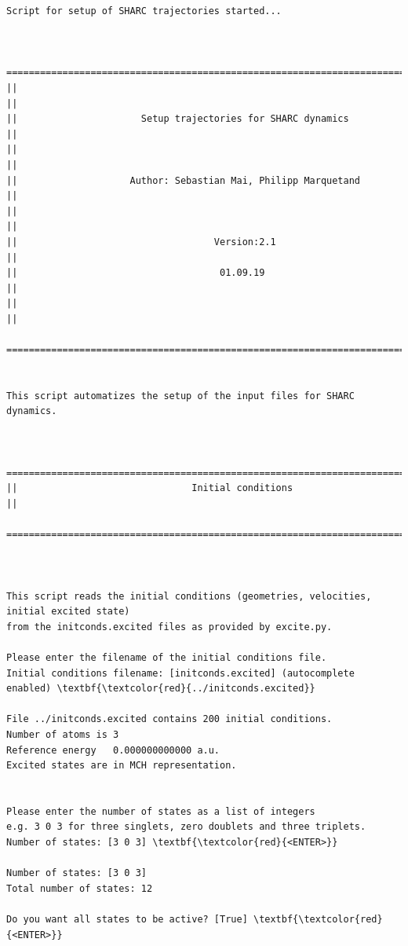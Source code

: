 \documentclass[a4paper,11pt,DIV=15,openany]{scrbook}
\begin{document}
\begin{oframed}
\footnotesize\begin{Verbatim}[commandchars=\\\{\}]
Script for setup of SHARC trajectories started...


  ================================================================================
||                                                                                ||
||                      Setup trajectories for SHARC dynamics                     ||
||                                                                                ||
||                    Author: Sebastian Mai, Philipp Marquetand                   ||
||                                                                                ||
||                                   Version:2.1                                  ||
||                                    01.09.19                                    ||
||                                                                                ||
  ================================================================================


This script automatizes the setup of the input files for SHARC dynamics.
  

  ================================================================================
||                               Initial conditions                               ||
  ================================================================================



This script reads the initial conditions (geometries, velocities, initial excited state)
from the initconds.excited files as provided by excite.py.

Please enter the filename of the initial conditions file.
Initial conditions filename: [initconds.excited] (autocomplete enabled) \textbf{\textcolor{red}{../initconds.excited}}

File ../initconds.excited contains 200 initial conditions.
Number of atoms is 3
Reference energy   0.000000000000 a.u.
Excited states are in MCH representation.


Please enter the number of states as a list of integers
e.g. 3 0 3 for three singlets, zero doublets and three triplets.
Number of states: [3 0 3] \textbf{\textcolor{red}{<ENTER>}}

Number of states: [3 0 3]
Total number of states: 12

Do you want all states to be active? [True] \textbf{\textcolor{red}{<ENTER>}}


\end{Verbatim}
\end{oframed}
\end{document}
